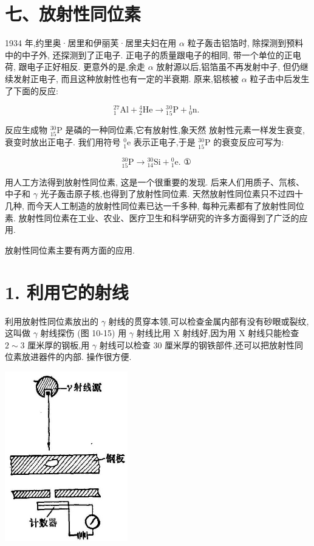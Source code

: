 \documentclass[10pt]{article}
\newcommand{\customfootnote}[1]{
  \let\thefootnote\relax\footnotetext{#1}
}
\begin{document}
\section*{七、放射性同位素}

1934 年,约里奥·居里和伊丽芙·居里夫妇在用 \(\alpha\) 粒子轰击铝箔时, 除探测到预料中的中子外, 还探测到了正电子. 正电子的质量跟电子的相同, 带一个单位的正电荷, 跟电子正好相反. 更意外的是,余走 \(\alpha\) 放射源以后,铝箔虽不再发射中子, 但仍继续发射正电子, 而且这种放射性也有一定的半衰期. 原来,铝核被 \(\alpha\) 粒子击中后发生了下面的反应:

\[
{}_{1}^{27}\mathrm{{Al}} + {}_{2}^{4}\mathrm{{He}} \rightarrow {}_{1}^{3}{}_{5}^{0}\mathrm{P} + {}_{0}^{1}\mathrm{n}\text{. }
\]

反应生成物 \({}_{15}^{30}\mathrm{P}\) 是磷的一种同位素,它有放射性,象天然 放射性元素一样发生衰变, 衰变时放出正电子. 我们用符号 \({}_{1}^{0}\mathrm{e}\) 表示正电子,于是 \({}_{15}^{30}\mathrm{P}\) 的衰变反应可写为:

\[
{}_{15}^{30}\mathrm{P} \rightarrow {}_{14}^{30}\mathrm{{Si}} + {}_{1}^{0}\mathrm{e}\text{. ① }
\]

用人工方法得到放射性同位素, 这是一个很重要的发现. 后来人们用质子、氘核、中子和 \(\gamma\) 光子轰击原子核,也得到了放射性同位素. 天然放射性同位素只不过四十几种, 而今天人工制造的放射性同位素已达一千多种, 每种元素都有了放射性同位素. 放射性同位素在工业、农业、医疗卫生和科学研究的许多方面得到了广泛的应用.

放射性同位素主要有两方面的应用.

\section*{1. 利用它的射线}

利用放射性同位素放出的 \(\gamma\) 射线的贯穿本领,可以检查金属内部有没有砂眼或裂纹,这叫做 \(\gamma\) 射线探伤 (图 10-15) 用 \(\gamma\) 射线比用 \(\mathrm{X}\) 射线好,因为用 \(\mathrm{X}\) 射线只能检查 \(2 \sim 3\) 厘米厚的钢板,用 \(\gamma\) 射线可以检查 30 厘米厚的钢铁部件,还可以把放射性同位素放进器件的内部. 操作很方便.

\customfootnote{

① 实际上还同时放出一个中微子.

}

\begin{center}
\includegraphics[max width=0.4\textwidth]{images/01913056-1f15-74d8-9184-9aab52c9d66b_353_155826.jpg}
\end{center}
\end{document}
